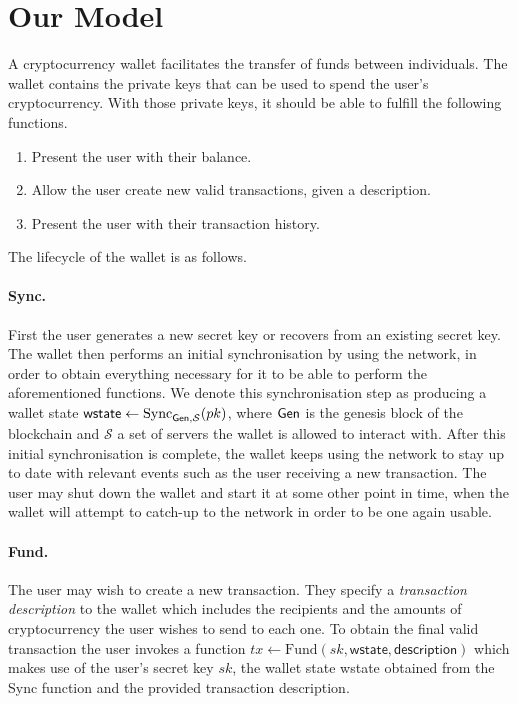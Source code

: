 \section{Our Model}
\label{model}
A cryptocurrency wallet facilitates the transfer of funds between individuals. The wallet contains the private keys that can be used to spend the user's cryptocurrency. With those private keys, it should be able to fulfill the following functions.

\begin{enumerate}
    \item Present the user with their balance.
    \item Allow the user create new valid transactions, given a description.
    \item Present the user with their transaction history.
\end{enumerate}

The lifecycle of the wallet is as follows.
\paragraph{Sync.}
First the user generates a new secret key or recovers from an existing secret key. The wallet then performs an initial synchronisation by using the network, in order to obtain everything necessary for it to be able to perform the aforementioned functions. We denote this synchronisation step as producing a wallet state $\textsf{wstate} \gets \text{Sync}_{\textsf{Gen}, \mathcal{S}}(pk)$, where $\textsf{Gen}$ is the genesis block of the blockchain and $\mathcal{S}$ a set of servers the wallet is allowed to interact with. After this initial synchronisation is complete, the wallet keeps using the network to stay up to date with relevant events such as the user receiving a new transaction. The user may shut down the wallet and start it at some other point in time, when the wallet will attempt to catch-up to the network in order to be one again usable.

\paragraph{Fund.}
The user may wish to create a new transaction. They specify a \emph{transaction description} to the wallet which includes the recipients and the amounts of cryptocurrency the user wishes to send to each one. To obtain the final valid transaction the user invokes a function $tx \gets \text{Fund}(sk, \textsf{wstate}, \textsf{description})$ which makes use of the user's secret key $sk$, the wallet state \textsf{wstate} obtained from the Sync function and the provided transaction \textsf{description}.

